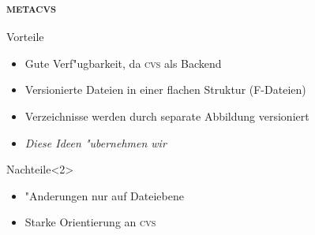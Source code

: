 \documentclass[german, presentation]{beamer}
\newcommand{\METACVS}{\textsc{metacvs}}
\newcommand{\CVS}{\textsc{cvs}}
\begin{document}
  

\begin{frame}
  \frametitle{\METACVS}
  \begin{block}{Vorteile}%
    \begin{itemize}
    \item Gute Verf"ugbarkeit, da \CVS{} als Backend
    \item Versionierte Dateien in einer flachen Struktur (F-Dateien)
    \item Verzeichnisse werden durch separate Abbildung versioniert
    \item<2> \emph{Diese Ideen "ubernehmen wir}
    \end{itemize}
  \end{block}
  \begin{block}{Nachteile}<2>
    \begin{itemize}
    \item "Anderungen nur auf Dateiebene
    \item Starke Orientierung an \CVS{}
    \end{itemize}
  \end{block}
\end{frame}
\end{document}

